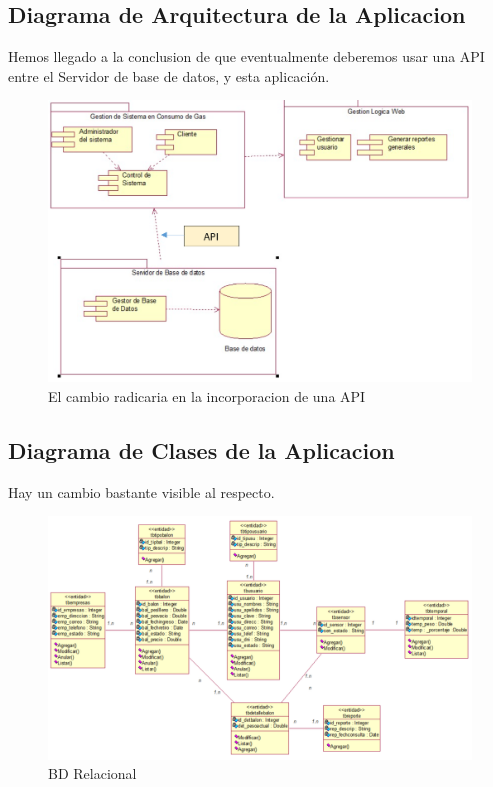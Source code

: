 \documentclass[twoside,twocolumn]{article}
\begin{document}
\begin{itemize}
\clearpage
\subsection{Diagrama de Arquitectura de la Aplicacion}
Hemos llegado a la conclusion de que eventualmente deberemos usar una API entre el Servidor de base de datos, y esta aplicación.

\begin{figure}[h!]
\centering
\includegraphics[scale=0.25]{Image/Diagramade Arquitectura.PNG}
\caption{El cambio radicaria en la incorporacion de una API}
\label{fig:Csha3}
\end{figure}

\subsection{Diagrama de Clases de la Aplicacion}
Hay un cambio bastante visible al respecto.

\begin{figure}[h!]
\centering
\includegraphics[scale=0.25]{Image/Digrama de clases pre.PNG}
\caption{BD Relacional}
\label{fig:Csha3}
\end{figure}


\end{itemize}
\end{document}
